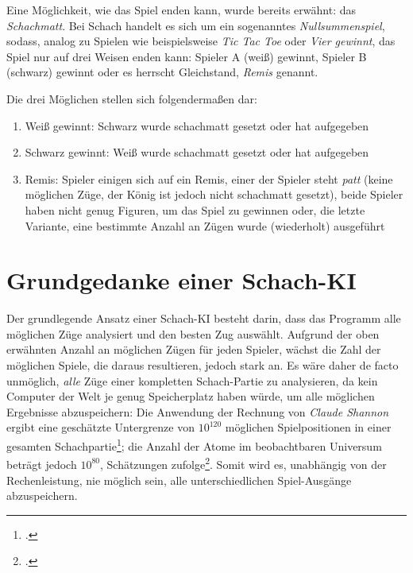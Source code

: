 Eine Möglichkeit, wie das Spiel enden kann, wurde bereits erwähnt: das \textit{Schachmatt}. Bei Schach handelt es sich um ein sogenanntes \textit{Nullsummenspiel}, sodass, analog zu Spielen wie beispielsweise \textit{Tic Tac Toe} oder \textit{Vier gewinnt}, das Spiel nur auf drei Weisen enden kann: Spieler A (weiß) gewinnt, Spieler B (schwarz) gewinnt oder es herrscht Gleichstand, \textit{Remis} genannt.

Die drei Möglichen stellen sich folgendermaßen dar:

\begin{enumerate}
    \item Weiß gewinnt: Schwarz wurde schachmatt gesetzt oder hat aufgegeben
    \item Schwarz gewinnt: Weiß wurde schachmatt gesetzt oder hat aufgegeben
    \item Remis: Spieler einigen sich auf ein Remis, einer der Spieler steht \textit{patt} (keine möglichen Züge, der König ist jedoch nicht schachmatt gesetzt), beide Spieler haben nicht genug Figuren, um das Spiel zu gewinnen oder, die letzte Variante, eine bestimmte Anzahl an Zügen wurde (wiederholt) ausgeführt
\end{enumerate}

\section{Grundgedanke einer Schach-KI}
Der grundlegende Ansatz einer Schach-KI besteht darin, dass das Programm alle möglichen Züge analysiert und den besten Zug auswählt. Aufgrund der oben erwähnten Anzahl an möglichen Zügen für jeden Spieler, wächst die Zahl der möglichen Spiele, die daraus resultieren, jedoch stark an. Es wäre daher de facto unmöglich, \textit{alle} Züge einer kompletten Schach-Partie zu analysieren, da kein Computer der Welt je genug Speicherplatz haben würde, um alle möglichen Ergebnisse abzuspeichern: Die Anwendung der Rechnung von \textit{Claude Shannon} ergibt eine geschätzte Untergrenze von $10^{120}$ möglichen Spielpositionen in einer gesamten Schachpartie\footcite{shannon}; die Anzahl der Atome im beobachtbaren Universum beträgt jedoch $10^{80}$, Schätzungen zufolge\footcite{merz}. Somit wird es, unabhängig von der Rechenleistung, nie möglich sein, alle unterschiedlichen Spiel-Ausgänge abzuspeichern.

